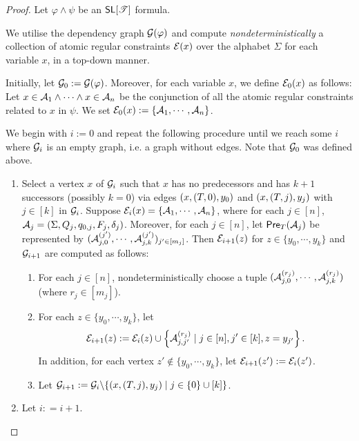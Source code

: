 \begin{proof}
Let $\varphi \wedge \psi$ be an $\textsf{SL}[\mathscr{T}]$ formula. 

We utilise the dependency graph $\mathcal{G}(\varphi)$ and compute \emph{nondeterministically} a collection of atomic regular constraints $\mathcal{E}(x)$ over the alphabet $\Sigma$ for each variable $x$, in a top-down manner.


Initially, let $\mathcal{G}_0:= \mathcal{G}(\varphi)$. Moreover, for each variable $x$, we define $\mathcal{E}_0(x)$ as follows: Let $x \in \mathcal{A}_1 \wedge \cdots \wedge x \in \mathcal{A}_n$ be the conjunction of all the atomic regular constraints related to $x$ in $\psi$. 
 We set $\mathcal{E}_0(x):=  \left\{\mathcal{A}_1,\cdots, \mathcal{A}_n \right\}$.

We begin with $i:= 0$ and repeat the following procedure until we reach some $i$ where $\mathcal{G}_i$ is an empty graph, i.e. a graph without edges.
Note that $\mathcal{G}_0$ was defined above.
\begin{enumerate}
\item Select a vertex $x$ of $\mathcal{G}_i$ such that $x$ has no predecessors  and has $k+1$ successors (possibly $k=0$) via edges $(x, (T, 0), y_0)$ and $(x, (T, j), y_j)$ with $j \in [k]$ in $\mathcal{G}_i$.  Suppose $\mathcal{E}_i(x)=\{\mathcal{A}_1, \cdots, \mathcal{A}_n\}$, where for each $j \in [n]$, $\mathcal{A}_j = (\Sigma, Q_j, q_{0,j}, F_j, \delta_j)$. Moreover, for each $j \in [n]$, let $\textsf{Pre}_{T}(\mathcal{A}_j)$ be represented by $(\mathcal{A}^{(j')}_{j, 0}, \cdots, \mathcal{A}^{(j')}_{j, k})_{ j'  \in [m_j]}$.
Then $\mathcal{E}_{i+1}(z)$ for $z \in  \{y_0,\cdots, y_k\}$ and $\mathcal{G}_{i+1}$ are computed as follows:
\begin{enumerate}
\item For each $j \in [n]$, nondeterministically choose a tuple $(\mathcal{A}^{(r_j)}_{j, 0}, \cdots, \mathcal{A}^{(r_j)}_{j, k})$ (where $r_j \in [m_j]$).
%
\item For each $z \in \{y_0,\cdots, y_k\}$, let
\[
    \mathcal{E}_{i+1}(z):= \mathcal{E}_{i}(z) \cup \left\{\mathcal{A}^{(r_j)}_{j, j'} \mid  j \in [n], j' \in [k], z = y_{j'} \right\}.
\]
In addition, for each vertex $z'  {\notin} \{y_0,\cdots, y_k\}$, let $\mathcal{E}_{i+1}(z') := \mathcal{E}_i(z')$.
%
\item Let $\mathcal{G}_{i+1}:= \mathcal{G}_i \backslash \{(x, (T, j), y_j) \mid j \in \{0\} \cup [k]\}$.
\end{enumerate}
%
\item Let $i: = i+1$.
\end{enumerate}


\end{proof}
